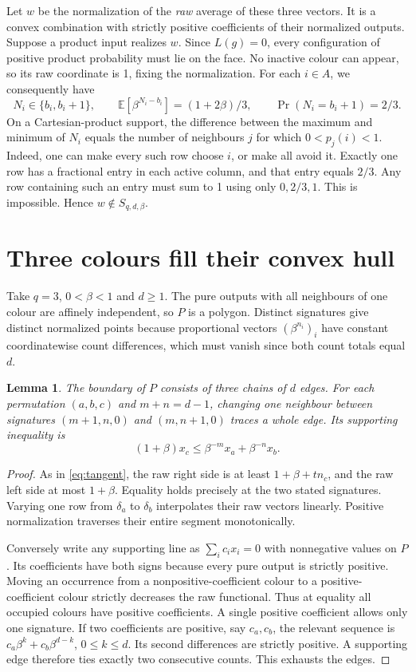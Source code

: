 \documentclass[11pt,reqno]{amsart}
\newtheorem{lemma}[theorem]{Lemma}
\newcommand{\Sbp}{S_{q,d,\beta}}
\newcommand{\E}{\mathbb E}
\begin{document}
Let $w$ be the normalization of the \emph{raw} average of these three vectors. It is a convex combination with strictly positive coefficients of their normalized outputs. Suppose a product input realizes $w$. Since $L(g)=0$, every configuration of positive product probability must lie on the face. No inactive colour can appear, so its raw coordinate is 1, fixing the normalization. For each $i\in A$, we consequently have
\[
 N_i\in\{b_i,b_i+1\},\qquad
 \E[\beta^{N_i-b_i}]=(1+2\beta)/3,\qquad
 \Pr(N_i=b_i+1)=2/3 .
\]
On a Cartesian-product support, the difference between the maximum and minimum of $N_i$ equals the number of neighbours $j$ for which $0<p_j(i)<1$. Indeed, one can make every such row choose $i$, or make all avoid it. Exactly one row has a fractional entry in each active column, and that entry equals $2/3$. Any row containing such an entry must sum to 1 using only $0,2/3,1$. This is impossible. Hence $w\notin\Sbp$.

\section{Three colours fill their convex hull}

Take $q=3$, $0<\beta<1$ and $d\ge1$. The pure outputs with all neighbours of one colour are affinely independent, so $P$ is a polygon. Distinct signatures give distinct normalized points because proportional vectors $(\beta^{n_i})_i$ have constant coordinatewise count differences, which must vanish since both count totals equal $d$.

\begin{lemma}\label{lem:edges}
The boundary of $P$ consists of three chains of $d$ edges. For each permutation $(a,b,c)$ and $m+n=d-1$, changing one neighbour between signatures $(m+1,n,0)$ and $(m,n+1,0)$ traces a whole edge. Its supporting inequality is
\begin{equation}\label{eq:edge}
 (1+\beta)x_c\le \beta^{-m}x_a+\beta^{-n}x_b .
\end{equation}
\end{lemma}
\begin{proof}
As in \eqref{eq:tangent}, the raw right side is at least $1+\beta+tn_c$, and the raw left side at most $1+\beta$. Equality holds precisely at the two stated signatures. Varying one row from $\delta_a$ to $\delta_b$ interpolates their raw vectors linearly. Positive normalization traverses their entire segment monotonically.

Conversely write any supporting line as $\sum_i c_i x_i=0$ with nonnegative values on $P$. Its coefficients have both signs because every pure output is strictly positive. Moving an occurrence from a nonpositive-coefficient colour to a positive-coefficient colour strictly decreases the raw functional. Thus at equality all occupied colours have positive coefficients. A single positive coefficient allows only one signature. If two coefficients are positive, say $c_a,c_b$, the relevant sequence is $c_a\beta^k+c_b\beta^{d-k}$, $0\le k\le d$. Its second differences are strictly positive. A supporting edge therefore ties exactly two consecutive counts. This exhausts the edges.
\end{proof}
\end{document}
